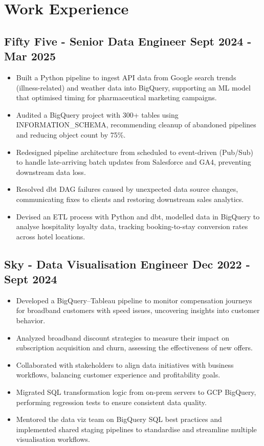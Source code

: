 \documentclass[a4paper, 10pt]{article}
\begin{document}
\vspace{-6.5mm}

\section*{Work Experience}

\subsection*{\textbf{Fifty Five - Senior Data Engineer} \hfill  Sept 2024 - Mar 2025}
\begin{itemize}[noitemsep]
    \item Built a Python pipeline to ingest API data from Google search trends (illness-related) and weather data into BigQuery, supporting an ML model that optimised timing for pharmaceutical marketing campaigns.
    \item Audited a BigQuery project with 300+ tables using INFORMATION\_SCHEMA, recommending cleanup of abandoned pipelines and reducing object count by 75\%.
    \item Redesigned pipeline architecture from scheduled to event-driven (Pub/Sub) to handle late-arriving batch updates from Salesforce and GA4, preventing downstream data loss.
    \item Resolved dbt DAG failures caused by unexpected data source changes, communicating fixes to clients and restoring downstream sales analytics.
    \item Devised an ETL process with Python and dbt, modelled data in BigQuery to analyse hospitality loyalty data, tracking booking-to-stay conversion rates across hotel locations.
\end{itemize}

\subsection*{\textbf{Sky - Data Visualisation Engineer} \hfill  Dec 2022 - Sept 2024}
\begin{itemize}[noitemsep]
    \item Developed a BigQuery–Tableau pipeline to monitor compensation journeys for broadband customers with speed issues, uncovering insights into customer behavior.
    \item Analyzed broadband discount strategies to measure their impact on subscription acquisition and churn, assessing the effectiveness of new offers.
    \item Collaborated with stakeholders to align data initiatives with business workflows, balancing customer experience and profitability goals.
    \item Migrated SQL transformation logic from on-prem servers to GCP BigQuery, performing regression tests to ensure consistent data quality.
    \item Mentored the data viz team on BigQuery SQL best practices and implemented shared staging pipelines to standardise and streamline multiple visualisation workflows.
\end{itemize}
\end{document}
